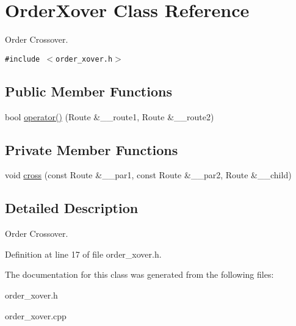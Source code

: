 \hypertarget{classOrderXover}{
\section{Order\-Xover Class Reference}
\label{classOrderXover}
}
Order Crossover.  


{\tt \#include $<$order\_\-xover.h$>$}

\subsection*{Public Member Functions}
\begin{CompactItemize}
\item 
\hypertarget{classOrderXover_0ff6aada669eb8173322ed68cda1ac61}{
bool \hyperlink{classOrderXover_0ff6aada669eb8173322ed68cda1ac61}{operator()} (Route \&\_\-\_\-route1, Route \&\_\-\_\-route2)}
\label{classOrderXover_0ff6aada669eb8173322ed68cda1ac61}

\end{CompactItemize}
\subsection*{Private Member Functions}
\begin{CompactItemize}
\item 
\hypertarget{classOrderXover_d2bf90b5f46ac4a344777e17bc5f364d}{
void \hyperlink{classOrderXover_d2bf90b5f46ac4a344777e17bc5f364d}{cross} (const Route \&\_\-\_\-par1, const Route \&\_\-\_\-par2, Route \&\_\-\_\-child)}
\label{classOrderXover_d2bf90b5f46ac4a344777e17bc5f364d}

\end{CompactItemize}


\subsection{Detailed Description}
Order Crossover. 



Definition at line 17 of file order\_\-xover.h.

The documentation for this class was generated from the following files:\begin{CompactItemize}
\item 
order\_\-xover.h\item 
order\_\-xover.cpp\end{CompactItemize}
